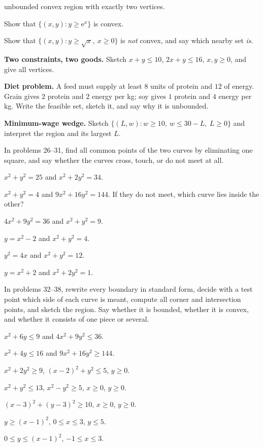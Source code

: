 \begin{problems}
        unbounded convex region with exactly two vertices.
  \item Show that $\{(x,y): y\ge \mathrm{e}^{x}\}$ is convex.
  \item Show that $\{(x,y): y\ge \sqrt{x},\ x\ge0\}$ is \emph{not}
        convex, and say which nearby set \emph{is}.
  \item \textbf{Two constraints, two goods.} Sketch
        $x+y\le 10$, \;$2x+y\le 16$, \;$x,y\ge0$, and give all vertices.
  \item \textbf{Diet problem.} A feed must supply at least $8$ units of
        protein and $12$ of energy. Grain gives $2$ protein and $2$ energy
        per kg; soy gives $1$ protein and $4$ energy per kg. Write the
        feasible set, sketch it, and say why it is unbounded.
  \item \textbf{Minimum-wage wedge.} Sketch
        $\{(L,w): w\ge 10,\ w\le 30-L,\ L\ge0\}$ and interpret the region
        and its largest $L$.
\end{problems}

In problems 26--31, find all common points of the two curves by eliminating
one square, and say whether the curves cross, touch, or do not meet at all.

\begin{problems}[resume]
  \item $x^{2}+y^{2}=25$ and $x^{2}+2y^{2}=34$.
  \item $x^{2}+y^{2}=4$ and $9x^{2}+16y^{2}=144$. If they do not meet,
        which curve lies inside the other?
  \item $4x^{2}+9y^{2}=36$ and $x^{2}+y^{2}=9$.
  \item $y=x^{2}-2$ and $x^{2}+y^{2}=4$.
  \item $y^{2}=4x$ and $x^{2}+y^{2}=12$.
  \item $y=x^{2}+2$ and $x^{2}+2y^{2}=1$.
\end{problems}

In problems 32--38, rewrite every boundary in standard form, decide with a
test point which side of each curve is meant, compute all corner and
intersection points, and sketch the region. Say whether it is bounded,
whether it is convex, and whether it consists of one piece or several.

\begin{problems}[resume]
  \item $x^{2}+6y\le9$ \;and\; $4x^{2}+9y^{2}\le36$.
  \item $x^{2}+4y\le16$ \;and\; $9x^{2}+16y^{2}\ge144$.
  \item $x^{2}+2y^{2}\ge9$, \;$(x-2)^{2}+y^{2}\le5$, \;$y\ge0$.
  \item $x^{2}+y^{2}\le13$, \;$x^{2}-y^{2}\ge5$, \;$x\ge0$, \;$y\ge0$.
  \item $(x-3)^{2}+(y-3)^{2}\ge10$, \;$x\ge0$, \;$y\ge0$.
  \item $y\ge(x-1)^{2}$, \;$0\le x\le3$, \;$y\le5$.
  \item $0\le y\le(x-1)^{2}$, \;$-1\le x\le3$.
\end{problems}

